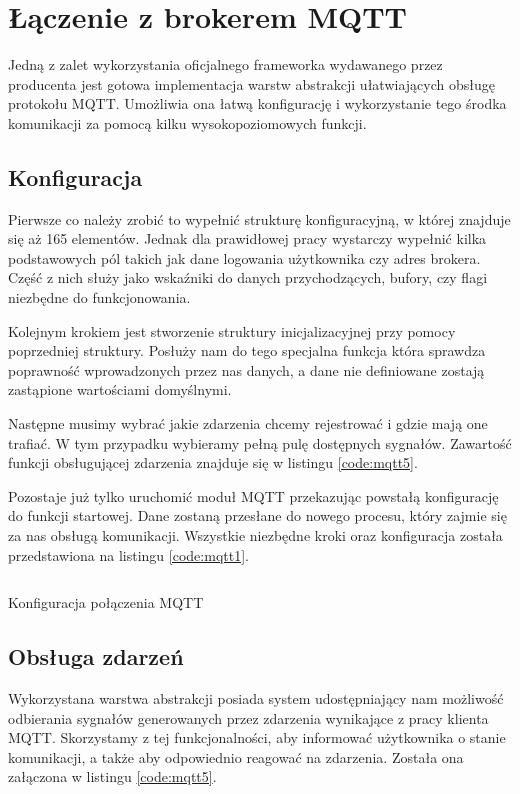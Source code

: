     \section{Łączenie z brokerem MQTT}
        Jedną z zalet wykorzystania oficjalnego frameworka wydawanego przez producenta jest gotowa implementacja warstw abstrakcji ułatwiających obsługę protokołu MQTT. Umożliwia ona łatwą konfigurację i wykorzystanie tego środka komunikacji za pomocą kilku wysokopoziomowych funkcji.
        
        \subsection{Konfiguracja}
        Pierwsze co należy zrobić to wypełnić strukturę konfiguracyjną, w której znajduje się aż 165 elementów. Jednak dla prawidłowej pracy wystarczy wypełnić kilka podstawowych pól takich jak dane logowania użytkownika czy adres brokera. Część z nich służy jako wskaźniki do danych przychodzących, bufory, czy flagi niezbędne do funkcjonowania. 
        
        Kolejnym krokiem jest stworzenie struktury inicjalizacyjnej przy pomocy poprzedniej struktury. Posłuży nam do tego specjalna funkcja która sprawdza poprawność wprowadzonych przez nas danych, a dane nie definiowane zostają zastąpione wartościami domyślnymi. 
        
        Następne musimy wybrać jakie zdarzenia chcemy rejestrować i gdzie mają one trafiać. W tym przypadku wybieramy pełną pulę dostępnych sygnałów. Zawartość funkcji obsługującej zdarzenia znajduje się w listingu \ref{code:mqtt5}. 
        
        Pozostaje już tylko uruchomić moduł MQTT przekazując powstałą konfigurację do funkcji startowej. Dane zostaną przesłane do nowego procesu, który zajmie się za nas obsługą komunikacji. Wszystkie niezbędne kroki oraz konfiguracja została przedstawiona na listingu \ref{code:mqtt1}. 
        
        \begin{kod}
            \inputminted[firstline=130]{cpp}{esp/listings/mqtt.cpp}
            \caption{Konfiguracja połączenia MQTT}
            \label{code:mqtt1}
        \end{kod}
        
        
        
        \subsection{Obsługa zdarzeń}
        Wykorzystana warstwa abstrakcji posiada system udostępniający nam możliwość odbierania sygnałów generowanych przez zdarzenia wynikające z pracy klienta MQTT. Skorzystamy z tej funkcjonalności, aby informować użytkownika o stanie komunikacji, a także aby odpowiednio reagować na zdarzenia. Została ona załączona w listingu \ref{code:mqtt5}.
        
